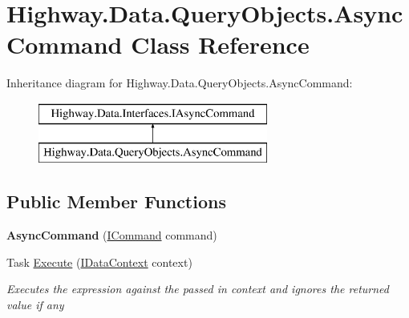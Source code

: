 \hypertarget{class_highway_1_1_data_1_1_query_objects_1_1_async_command}{\section{Highway.\-Data.\-Query\-Objects.\-Async\-Command Class Reference}
\label{class_highway_1_1_data_1_1_query_objects_1_1_async_command}
}
Inheritance diagram for Highway.\-Data.\-Query\-Objects.\-Async\-Command\-:\begin{figure}[H]
\begin{center}
\leavevmode
\includegraphics[height=2.000000cm]{class_highway_1_1_data_1_1_query_objects_1_1_async_command}
\end{center}
\end{figure}
\subsection*{Public Member Functions}
\begin{DoxyCompactItemize}
\item 
\hypertarget{class_highway_1_1_data_1_1_query_objects_1_1_async_command_a9652ac653026b1bd8f4aeee2d8a4eb1d}{{\bfseries Async\-Command} (\hyperlink{interface_highway_1_1_data_1_1_interfaces_1_1_i_command}{I\-Command} command)}\label{class_highway_1_1_data_1_1_query_objects_1_1_async_command_a9652ac653026b1bd8f4aeee2d8a4eb1d}

\item 
Task \hyperlink{class_highway_1_1_data_1_1_query_objects_1_1_async_command_a03a37fc95c41d551c4bfc75ae4eb841b}{Execute} (\hyperlink{interface_highway_1_1_data_1_1_interfaces_1_1_i_data_context}{I\-Data\-Context} context)
\begin{DoxyCompactList}\small\item\em Executes the expression against the passed in context and ignores the returned value if any \end{DoxyCompactList}\end{DoxyCompactItemize}


